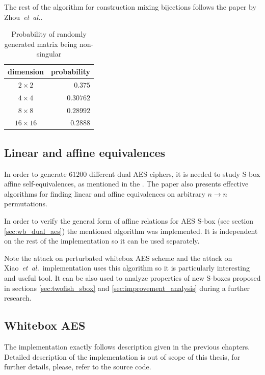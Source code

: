 \documentclass[11pt,oneside,final]{fithesis2}
\newcommand{\eal}{\emph{et~al.}}
\begin{document}
    The rest of the algorithm for construction mixing bijections follows the paper by Zhou~\eal.
    
    \begin{table}[!htb]
    \begin{center}
    \begin{tabular}{ | c | r | }
	\hline
	dimension     & probability    \\ \hline \hline
	$2\times2$    & $0.375$        \\ \hline
	$4\times4$    & $ 0.30762$     \\ \hline
	$8\times8$    & $ 0.28992$     \\ \hline
	$16\times16$  & $ 0.2888$      \\ \hline
    \end{tabular}
    \caption{Probability of randomly generated matrix being non-singular}
    \label{tbl:random_matrix_nonsingular_probab}
    \end{center} 
    \end{table}
    
    \subsection{Linear and affine equivalences}
    In order to generate $61200$ different dual AES ciphers, it is needed to study S-box affine self-equivalences, as mentioned in the \citep{Biryukov:2003:TCL:1766171.1766175}.
    The paper also presents effective algorithms for finding linear and affine equivalences on arbitrary $n \rightarrow n$ permutations. 
    
    In order to verify the general form of affine relations for AES S-box (see section \ref{sec:wb_dual_aes}) the mentioned algorithm was implemented. It is independent 
    on the rest of the implementation so it can be used separately. 
    
    Note the attack on perturbated whitebox AES scheme \citep{conf/indocrypt/MulderWP10} 
    and the attack on Xiao~\eal~implementation \citep{conf/sacrypt/MulderRP12} uses this algorithm so it is particularly interesting and useful tool. It can be also used to analyze properties
    of new S-boxes proposed in sections \ref{sec:twofish_sbox} and \ref{sec:improvement_analysis} during a further research.
    
    \subsection{Whitebox AES}
    The implementation exactly follows description given in the previous chapters. Detailed description of the implementation is out of scope of this thesis, 
    for further details, please, refer to the source code. 
    
\end{document}
